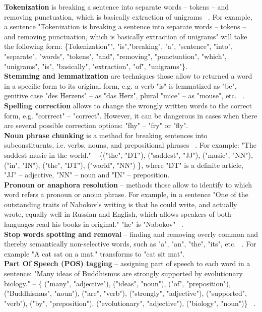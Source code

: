 \textbf{Tokenization} is breaking a sentence into separate words – tokens – and removing punctuation, which is basically extraction of unigrams ~\cite{token}. For example, a sentence "Tokenization is breaking a sentence into separate words – tokens – and removing punctuation, which is basically extraction of unigrams" will take the following form: \{Tokenization"", "is","breaking", "a", "sentence", "into", "separate", "words", "tokens", "and", "removing", "punctuation", "which", "unigrams", "is", "basically", "extraction", "of", "unigrams"\}. \\

\textbf{Stemming and lemmatization} are techniques those allow to returned a word in a specific form to its original form, e.g. a verb "is" is lemmatized as "be", genitive case "des Herzens" -- as "das Herz", plural "mice" -- as "mouse", etc. ~\cite{lemm}.\\

\textbf{Spelling correction} allows to change the wrongly written words to the correct form, e.g. "corrrect" -- "correct". However, it can be dangerous in cases when there are several possible correction options: "fhy" -- "fry" or "fly".\\

\textbf{Noun phrase chunking} is a method for breaking sentences into subconstituents, i.e. verbs, nouns, and prepositional phrases ~\cite{chunk}. For example: "The saddest music in the world." -- \{("the", "DT"), ("saddest", "JJ"), ("music", "NN"), ("in", "IN"), ("the", "DT"), ("world", "NN") \}, where "DT" is a definite article, "JJ" -- adjective, "NN" -- noun and "IN" -- preposition.\\

\textbf{Pronoun or anaphora resolution} -- methods those allow to identify to which word refers a pronoun or anoun phrase. For example, in a sentence "One of the outstanding traits of Nabokov's writing is that he could write, and actually wrote, equally well in Russian and English, which allows speakers of both languages read his books in original." "he" is "Nabokov" ~\cite{anaphora}.\\

\textbf{Stop words spotting and removal} -- finding and removing overly common and thereby semantically non-selective words, such as "a", "an", "the", "its", etc. ~\cite{stop}. For example "A cat sat on a mat." transforms to "cat sit mat".\\

\textbf{Part Of Speech (POS) tagging} -- assigning part of speech to each word in a sentence: "Many ideas of Buddhismus are strongly supported by evolutionary biology." -- \{ ("many", "adjective"), ("ideas", "noun"), ("of", "preposition"), ("Buddhismus", "noun"), ("are", "verb"), ("strongly", "adjective"), ("supported", "verb"), ("by", "preposition"), ("evolutionary", "adjective"),  ("biology", "noun")\} ~\cite{POS}.

